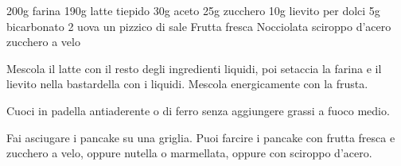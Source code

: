 \begin{ingreds}
	200g farina 
	190g latte tiepido 
	30g aceto 
	25g zucchero
	10g lievito per dolci
	5g bicarbonato
	2 uova
	un pizzico di sale
\columnbreak
	Frutta fresca
	Nocciolata
	sciroppo d'acero 
	zucchero a velo
\end{ingreds}

\begin{method}
Mescola il latte con il resto degli ingredienti liquidi, poi setaccia la farina e il lievito nella bastardella con i liquidi. Mescola energicamente con la frusta.

Cuoci in padella antiaderente o di ferro senza aggiungere grassi a fuoco medio.

Fai asciugare i pancake su una griglia. Puoi farcire i pancake con frutta fresca e zucchero a velo, oppure nutella o marmellata, oppure con sciroppo d'acero.
\end {method}



